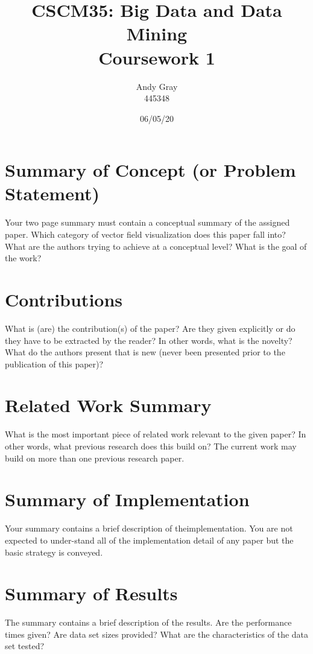 \documentclass[a4paper,10pt]{article}
\begin{document}
\title{\textbf{CSCM35: Big Data and Data Mining \\Coursework 1}}
\date{06/05/20}
\author{Andy Gray\\445348}

\maketitle

\section{Summary of Concept (or Problem Statement)}
Your two page summary must contain a conceptual summary of the assigned paper. Which category of vector field visualization does this paper fall into? What are the authors trying to achieve at a conceptual level? What is the goal of the work?


\section{Contributions}
What is (are) the contribution(s) of the paper? Are they given explicitly or do they have to be extracted by the reader? In other words, what is the novelty? What do the authors present that is new (never been presented prior to the publication of this paper)?


\section{Related Work Summary}
What is the most important piece of related work relevant to the given paper? In other words, what previous research does this build on? The current work may build on more than one previous research paper.


\section{Summary of Implementation}
Your summary contains a brief description of theimplementation. You are not expected to under-stand all of the implementation detail of any paper but the basic strategy is conveyed.


\section{Summary of Results}
The summary contains a brief description of the results. Are the performance times given? Are data set sizes provided? What are the characteristics of the data set tested?
\end{document}
